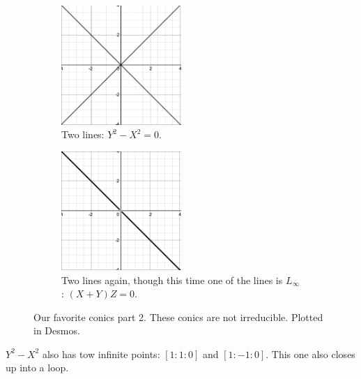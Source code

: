 \documentclass[12pt]{article}
\theoremstyle{definition}
\begin{document}
\begin{figure}[H]
 
    \begin{subfigure}{0.5\textwidth}
        \centering
        \includegraphics[width=0.5\textwidth]{40.png}
        \caption{Two lines: $Y^2-X^2=0$.}
        \label{fig:subim2}
    \end{subfigure}
    \hfill
    \begin{subfigure}{0.5\textwidth}
        \centering
        \includegraphics[width=0.5\textwidth]{41.png}
        \caption{Two lines again, though this time one of the lines is $L_{\infty}$: $(X+Y)Z=0$. }
        \label{fig:subim2}
    \end{subfigure}

    \caption{Our favorite conics part 2. These conics are not irreducible. Plotted in Desmos.}
    
\end{figure}
$Y^2-X^2$ also has tow infinite points: $[1:1:0]$ and $[1:-1:0]$. This one also closes up into a loop.
\end{document}
